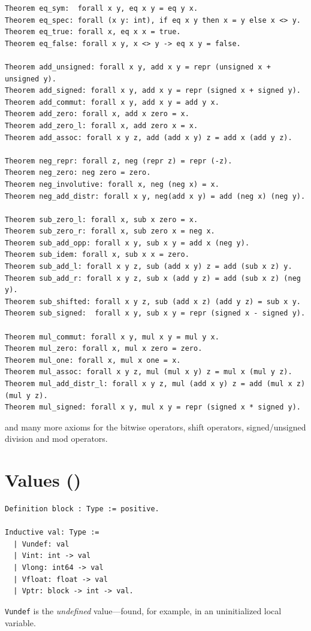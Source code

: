\documentclass[12pt,fleqn,openany,oneside,showtrims]{memoir}
\newcommand{\ychapter}[2]{\chapter[#1]{#1 \hfill \normalsize #2}}
\begin{document}
\begin{lstlisting}
Theorem eq_sym:  forall x y, eq x y = eq y x.
Theorem eq_spec: forall (x y: int), if eq x y then x = y else x <> y.
Theorem eq_true: forall x, eq x x = true.
Theorem eq_false: forall x y, x <> y -> eq x y = false.

Theorem add_unsigned: forall x y, add x y = repr (unsigned x + unsigned y).
Theorem add_signed: forall x y, add x y = repr (signed x + signed y).
Theorem add_commut: forall x y, add x y = add y x.
Theorem add_zero: forall x, add x zero = x.
Theorem add_zero_l: forall x, add zero x = x.
Theorem add_assoc: forall x y z, add (add x y) z = add x (add y z).

Theorem neg_repr: forall z, neg (repr z) = repr (-z).
Theorem neg_zero: neg zero = zero.
Theorem neg_involutive: forall x, neg (neg x) = x.
Theorem neg_add_distr: forall x y, neg(add x y) = add (neg x) (neg y).

Theorem sub_zero_l: forall x, sub x zero = x.
Theorem sub_zero_r: forall x, sub zero x = neg x.
Theorem sub_add_opp: forall x y, sub x y = add x (neg y).
Theorem sub_idem: forall x, sub x x = zero.
Theorem sub_add_l: forall x y z, sub (add x y) z = add (sub x z) y.
Theorem sub_add_r: forall x y z, sub x (add y z) = add (sub x z) (neg y).
Theorem sub_shifted: forall x y z, sub (add x z) (add y z) = sub x y.
Theorem sub_signed:  forall x y, sub x y = repr (signed x - signed y).

Theorem mul_commut: forall x y, mul x y = mul y x.
Theorem mul_zero: forall x, mul x zero = zero.
Theorem mul_one: forall x, mul x one = x.
Theorem mul_assoc: forall x y z, mul (mul x y) z = mul x (mul y z).
Theorem mul_add_distr_l: forall x y z, mul (add x y) z = add (mul x z) (mul y z).
Theorem mul_signed: forall x y, mul x y = repr (signed x * signed y).
\end{lstlisting}
and many more axioms for the bitwise operators, shift operators,
signed/unsigned division and mod operators.


\ychapter{Values}{()}

\begin{lstlisting}
Definition block : Type := positive.

Inductive val: Type :=
  | Vundef: val
  | Vint: int -> val
  | Vlong: int64 -> val
  | Vfloat: float -> val
  | Vptr: block -> int -> val.
\end{lstlisting}

\lstinline{Vundef} is the \emph{undefined} value---found, for example,
in an uninitialized local variable.
\end{document}
